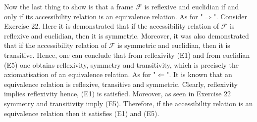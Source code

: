 \documentclass[11pt,a4paper]{article}
\begin{document}
Now the last thing to show is that a frame $\mathcal{F}$ is reflexive and euclidian if and only if its accessibility relation is an equivalence relation. As for "$\Rightarrow$". Consider Exercise 22. Here it is demonstrated that if the accessibility relation of $\mathcal{F}$ is reflexive and euclidian, then it is symmetric. Moreover, it was also demonstrated that if the accessibility relation of $\mathcal{F}$ is symmetric and euclidian, then it is transitive. Hence, one can conclude that from reflexivity (E1) and from euclidian (E5) one obtains reflexivity, symmetry and transitivity, which is precisely the axiomatisation of an equivalence relation.  As for "$\Leftarrow$". It is known that an equivalence relation is reflexive, transitive and symmetric. Clearly, reflexivity implies reflexivity hence, (E1) is satisfied. Moreover, as seen in Exercise 22 symmetry and transitivity imply (E5). Therefore, if the accessibility relation is an equivalence relation then it satisfies (E1) and (E5).
\end{document}
